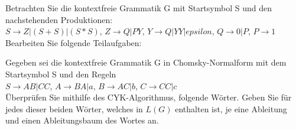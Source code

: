 \documentclass[10pt, a4paper]{exam}
\begin{document}
\begin{questions}
    \question Betrachten Sie die kontextfreie Grammatik G mit Startsymbol S und den nachstehenden Produktionen:\\
    $S\rightarrow Z | (S + S) | (S * S)$, $Z\rightarrow Q | PY$, $Y\rightarrow Q | YY | epsilon$,
    $Q\rightarrow 0 | P$, $P\rightarrow 1$\\
    Bearbeiten Sie folgende Teilaufgaben:

    \question Gegeben sei die kontextfreie Grammatik G in Chomsky-Normalform mit dem Startsymbol S und den Regeln\\
    $S \rightarrow AB | CC$, $A \rightarrow BA | a$, $B \rightarrow AC | b$, $C \rightarrow CC | c$\\
    Überprüfen Sie mithilfe des CYK-Algorithmus, folgende Wörter. Geben Sie für jedes dieser beiden Wörter, welches in $L(G)$ enthalten ist, je eine Ableitung und einen Ableitungsbaum des Wortes an.
\end{questions}
\end{document}
